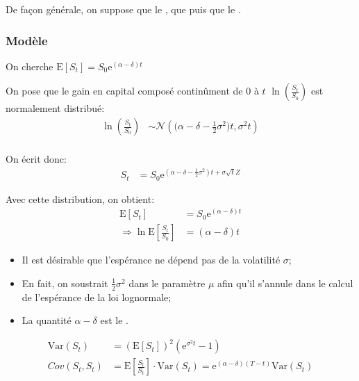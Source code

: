 \documentclass[10pt, french]{article}
\begin{document}
\begin{multicols*}{2}
De façon générale, on suppose que le , que  puis que le .


\columnbreak
\subsubsection*{Modèle}
On cherche $\text{E}[S_{t}]	=	S_{0}\textrm{e}^{(\alpha - \delta)t}$


\begin{definitionNOHFILL}[Distribution]
On pose que le gain en capital composé continûment de $0$ à $t$ $\ln\left(\frac{S_{t}}{S_{0}}\right)$ est normalement distribué: \\
\begin{align*}
	\ln\left(\frac{S_{t}}{S_{0}}\right) 
	&\sim	\mathcal{N}\left(\Big(\alpha - \delta - \frac{1}{2}\sigma^{2}\Big)t, \sigma^{2}t\right)	\\
\end{align*}

On écrit donc:
\begin{align*}
	S_{t} 
	&=	S_{0}\textrm{e}^{(\alpha - \delta - \frac{1}{2}\sigma^{2})t + \sigma\sqrt{t}Z}
\end{align*}
\end{definitionNOHFILL}

\begin{definitionNOHFILLsub}
Avec cette distribution, on obtient:
\begin{align*}
	\text{E}[S_{t}]
	&=	S_{0}\textrm{e}^{(\alpha - \delta)t}		\\
	\Rightarrow
	\ln\text{E}\left[\frac{S_{t}}{S_{0}}\right]
	&=	(\alpha - \delta)t
\end{align*}
\begin{itemize}
	\item	Il est désirable que l'espérance ne dépend pas de la volatilité $\sigma$;
	\item	En fait, on soustrait $\frac{1}{2}\sigma^{2}$ dans le paramètre $\mu$ afin qu'il s'annule dans le calcul de l'espérance de la loi lognormale;
	\item	La quantité $\alpha	-	\delta$ est le .
\end{itemize}
\begin{align*}
	\text{Var}(S_{t})
	&=	\left(\text{E}[S_{t}]\right)^{2} \left(\textrm{e}^{\sigma^{2}t} - 1\right)	\\
	Cov(S_{t}, S_{t})
	&=	\text{E}\left[\frac{S_{t}}{S_{t}}\right] \cdot \text{Var}(S_{t})	
	=	\textrm{e}^{(\alpha - \delta)(T - t)} \text{Var}(S_{t})
\end{align*}
\end{definitionNOHFILLsub}


\end{multicols*}
\end{document}
